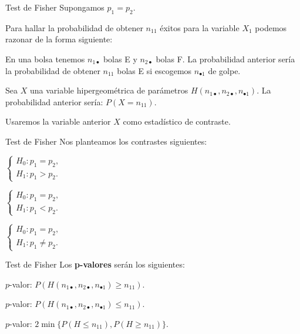 \documentclass[
  ignorenonframetext,
]{beamer}
\begin{document}
\begin{frame}{Test de Fisher}
\protect\hypertarget{test-de-fisher-2}{}
Supongamos \(p_1=p_2\).

Para hallar la probabilidad de obtener \(n_{11}\) éxitos para la
variable \(X_1\) podemos razonar de la forma siguiente:

En una bolsa tenemos \(n_{1\bullet}\) bolas E y \(n_{2\bullet}\) bolas
F. La probabilidad anterior sería la probabilidad de obtener \(n_{11}\)
bolas E si escogemos \(n_{\bullet 1}\) de golpe.

Sea \(X\) una variable hipergeométrica de parámetros
\(H(n_{1\bullet},n_{2\bullet},n_{\bullet1})\). La probabilidad anterior
sería: \(P(X=n_{11})\).

Usaremos la variable anterior \(X\) como estadístico de contraste.
\end{frame}

\begin{frame}{Test de Fisher}
\protect\hypertarget{test-de-fisher-3}{}
Nos planteamos los contrastes siguientes:

\(\left\{\begin{array}{l} H_0:p_1=p_2,\\ H_1:p_1> p_2. \end{array}\right.\)

\(\left\{\begin{array}{l} H_0:p_1=p_2,\\ H_1:p_1< p_2. \end{array}\right.\)

\(\left\{\begin{array}{l} H_0:p_1=p_2,\\ H_1:p_1\neq p_2. \end{array}\right.\)
\end{frame}

\begin{frame}{Test de Fisher}
\protect\hypertarget{test-de-fisher-4}{}
Los \textbf{p-valores} serán los siguientes:

\(p\)-valor:
\(P(H(n_{1\bullet},n_{2\bullet},n_{\bullet1})\geq n_{11})\).

\(p\)-valor:
\(P(H(n_{1\bullet},n_{2\bullet},n_{\bullet1})\leq n_{11})\).

\(p\)-valor: \(2\min\{P(H\leq n_{11}), P(H\geq n_{11})\}\).
\end{frame}
\end{document}
